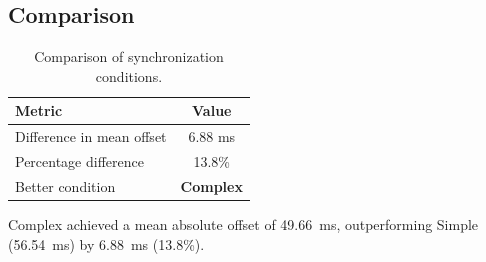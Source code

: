 \subsection*{Comparison}

\begin{table}[h!]
\centering
\begin{tabular}{|l|c|}
\hline
Metric & Value \\
\hline
Difference in mean offset & 6.88 ms \\
Percentage difference & 13.8\% \\
Better condition & \textbf{Complex} \\
\hline
\end{tabular}
\caption{Comparison of synchronization conditions.}
\label{tab:sync_comparison}
\end{table}

Complex achieved a mean absolute offset of 49.66~ms, outperforming Simple (56.54~ms) by 6.88~ms (13.8\%).
